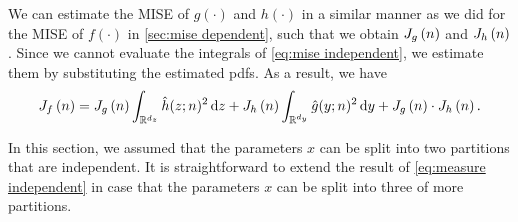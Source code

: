 We can estimate the MISE of $g(\cdot)$ and $h(\cdot)$ in a similar manner as we did for the MISE of $f(\cdot)$ in \cref{sec:mise dependent}, such that we obtain $J_{g} \left( n \right)$ and $J_{h} \left( n \right)$. Since we cannot evaluate the integrals of \cref{eq:mise independent}, we estimate them by substituting the estimated pdfs. As a result, we have
\begin{dmath}
	\label{eq:measure independent}
	\measure{f}{n} = \measure{g}{n} \int_{\mathbb{R}^{d_z}} \hat{h}(z;n)^2 \ud z + \measure{h}{n} \int_{\mathbb{R}^{d_y}} \hat{g}(y;n)^2 \ud y + \measure{g}{n} \cdot \measure{h}{n}.
\end{dmath}

In this section, we assumed that the parameters $x$ can be split into two partitions that are independent. It is straightforward to extend the result of \cref{eq:measure independent} in case that the parameters $x$ can be split into three of more partitions. 
